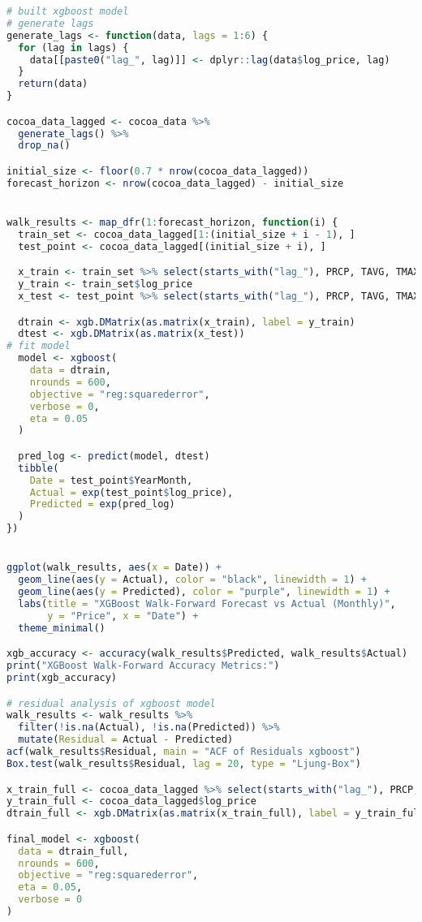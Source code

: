 \documentclass[10pt]{article}
\begin{document}
\begin{lstlisting}[language=R, caption=XGBoost]
# built xgboost model
# generate lags
generate_lags <- function(data, lags = 1:6) {
  for (lag in lags) {
    data[[paste0("lag_", lag)]] <- dplyr::lag(data$log_price, lag)
  }
  return(data)
}

cocoa_data_lagged <- cocoa_data %>%
  generate_lags() %>%
  drop_na()

initial_size <- floor(0.7 * nrow(cocoa_data_lagged))
forecast_horizon <- nrow(cocoa_data_lagged) - initial_size


walk_results <- map_dfr(1:forecast_horizon, function(i) {
  train_set <- cocoa_data_lagged[1:(initial_size + i - 1), ]
  test_point <- cocoa_data_lagged[(initial_size + i), ]

  x_train <- train_set %>% select(starts_with("lag_"), PRCP, TAVG, TMAX, TMIN)
  y_train <- train_set$log_price
  x_test <- test_point %>% select(starts_with("lag_"), PRCP, TAVG, TMAX, TMIN)

  dtrain <- xgb.DMatrix(as.matrix(x_train), label = y_train)
  dtest <- xgb.DMatrix(as.matrix(x_test))
# fit model
  model <- xgboost(
    data = dtrain,
    nrounds = 600,
    objective = "reg:squarederror",
    verbose = 0,
    eta = 0.05
  )

  pred_log <- predict(model, dtest)
  tibble(
    Date = test_point$YearMonth,
    Actual = exp(test_point$log_price),
    Predicted = exp(pred_log)
  )
})


ggplot(walk_results, aes(x = Date)) +
  geom_line(aes(y = Actual), color = "black", linewidth = 1) +
  geom_line(aes(y = Predicted), color = "purple", linewidth = 1) +
  labs(title = "XGBoost Walk-Forward Forecast vs Actual (Monthly)",
       y = "Price", x = "Date") +
  theme_minimal()

xgb_accuracy <- accuracy(walk_results$Predicted, walk_results$Actual)
print("XGBoost Walk-Forward Accuracy Metrics:")
print(xgb_accuracy)

# residual analysis of xgboost model
walk_results <- walk_results %>%
  filter(!is.na(Actual), !is.na(Predicted)) %>%
  mutate(Residual = Actual - Predicted)
acf(walk_results$Residual, main = "ACF of Residuals xgboost")
Box.test(walk_results$Residual, lag = 20, type = "Ljung-Box")

x_train_full <- cocoa_data_lagged %>% select(starts_with("lag_"), PRCP, TAVG, TMAX, TMIN)
y_train_full <- cocoa_data_lagged$log_price
dtrain_full <- xgb.DMatrix(as.matrix(x_train_full), label = y_train_full)

final_model <- xgboost(
  data = dtrain_full,
  nrounds = 600,
  objective = "reg:squarederror",
  eta = 0.05,
  verbose = 0
)
\end{lstlisting}
\end{document}

